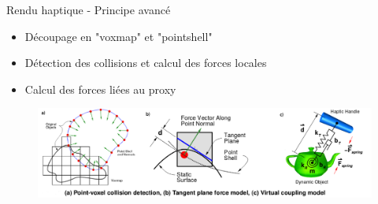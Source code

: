 {
\begin{frame}{Rendu haptique - Principe avancé}
\begin{itemize}
\item Découpage en "voxmap" et "pointshell"
\item Détection des collisions et calcul des forces locales
\item Calcul des forces liées au proxy
\end{itemize}
\begin{figure}
\centering
\includegraphics[width=\linewidth]{images/hapticVoxel_corrected}
\end{figure}
\end{frame}
}


